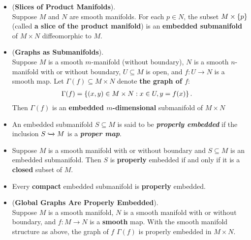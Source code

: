 \documentclass[11pt]{article}
\begin{document}
\begin{itemize}
\item \begin{proposition} (\textbf{Slices of Product Manifolds}). \citep{lee2003introduction}\\
Suppose $M$ and $N$ are smooth manifolds. For each $p \in N$, the subset $M \times \left\{p\right\}$ (called \textbf{a slice of the product manifold}) is an \textbf{embedded submanifold} of $M \times N$ diffeomorphic to $M$.
\end{proposition}

\item \begin{proposition} (\textbf{Graphs as Submanifolds}). \citep{lee2003introduction}\\
Suppose $M$ is a smooth $m$-manifold (without boundary), $N$ is a smooth $n$-manifold with or without boundary, $U \subseteq M$ is open, and $f: U \rightarrow N$ is a smooth map. Let $\Gamma(f) \subseteq M \times N$ denote \textbf{the graph of $f$}:
\begin{align*}
\Gamma(f) &= \left\{ (x,y) \in M \times N: x \in U, y = f(x)\right\}.
\end{align*} Then $\Gamma(f)$ is an \textbf{embedded $m$-dimensional} submanifold of $M \times N$
\end{proposition}

\item \begin{definition}
An embedded submanifold $S \subseteq M$ is said to be \emph{\textbf{properly embedded}} if the inclusion $S \xhookrightarrow{} M$ is a \emph{\textbf{proper map}}.
\end{definition}

\item \begin{proposition}
Suppose $M$ is a smooth manifold with or without boundary and $S \subseteq M$ is an embedded submanifold. Then $S$ is \textbf{properly} embedded if and only if it
is a \textbf{closed} subset of $M$.
\end{proposition}

\item \begin{corollary}
Every \textbf{compact} embedded submanifold is \textbf{properly} embedded.
\end{corollary}

\item \begin{proposition} (\textbf{Global Graphs Are Properly Embedded}). \citep{lee2003introduction}\\
Suppose $M$ is a smooth manifold, $N$ is a smooth manifold with or without boundary, and $f: M \rightarrow N$ is a \textbf{smooth} map. With the smooth manifold structure as above, the graph of $f$ $\Gamma(f)$ is properly embedded in $M \times N$.
\end{proposition}
\end{itemize}
\end{document}
